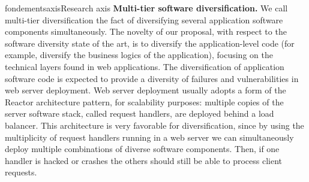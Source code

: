 \documentclass{ra2018}
\begin{document}
\begin{module}{fondements}{axis}{Research axis}
\textbf{Multi-tier software diversification.} We call  multi-tier diversification the fact of diversifying several application software components simultaneously. The novelty of our proposal, with respect to the software diversity state of the art, is to diversify the application-level code (for example, diversify the business logics of the application), focusing on the technical layers found in web applications. 
The diversification of application software code is expected to provide a diversity of failures and vulnerabilities in web server deployment. 
Web server deployment usually adopts a form of the Reactor architecture pattern, for scalability purposes: multiple copies of the server software stack, called request handlers, are deployed behind a load balancer. 
This architecture is very favorable for diversification, since by using the multiplicity of request handlers running in a web server we can simultaneously deploy multiple combinations of diverse software components. Then, if one handler is hacked or crashes the others should still be able to process client requests.


\end{module}







\end{document}

